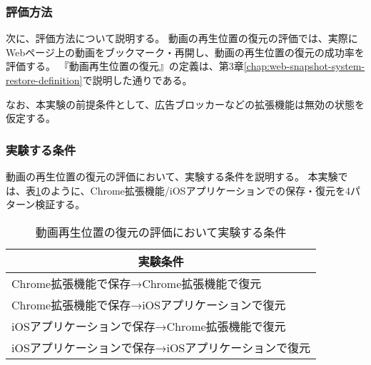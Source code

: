 \subsubsection{評価方法}
次に、評価方法について説明する。
動画の再生位置の復元の評価では、実際にWebページ上の動画をブックマーク・再開し、動画の再生位置の復元の成功率を評価する。
『動画再生位置の復元』の定義は、第3章\ref{chap:web-snapshot-system-restore-definition}で説明した通りである。

なお、本実験の前提条件として、広告ブロッカーなどの拡張機能は無効の状態を仮定する。

\subsubsection{実験する条件}
動画の再生位置の復元の評価において、実験する条件を説明する。
本実験では、表\ref{tb:evl-video-audio-conditions}のように、Chrome拡張機能/iOSアプリケーションでの保存・復元を4パターン検証する。

\begin{table}[htbp]
  \label{tb:evl-video-audio-conditions}
  \caption{動画再生位置の復元の評価において実験する条件}
  \begin{center}
    \begin{tabular}{|l|}
    \hline
    \multicolumn{1}{|c|}{\textbf{実験条件}} \\\hline
    Chrome拡張機能で保存→Chrome拡張機能で復元 \\ \hline
    Chrome拡張機能で保存→iOSアプリケーションで復元 \\ \hline
    iOSアプリケーションで保存→Chrome拡張機能で復元 \\ \hline
    iOSアプリケーションで保存→iOSアプリケーションで復元 \\ \hline
    \end{tabular}
  \end{center}
\end{table}
